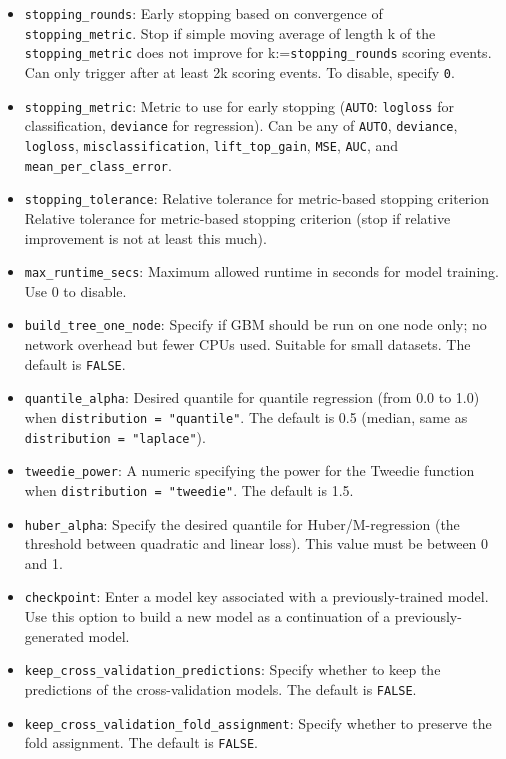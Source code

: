 \begin{itemize}
\item \texttt{stopping\_rounds}: Early stopping based on convergence of \\\texttt{stopping\_metric}. Stop if simple moving average of length k of the \texttt{stopping\_metric} does not improve for k:=\texttt{stopping\_rounds} scoring events. Can only trigger after at least 2k scoring events. To disable, specify \texttt{0}.
\item \texttt{stopping\_metric}: Metric to use for early stopping (\texttt{AUTO}: \texttt{logloss} for classification, \texttt{deviance} for regression). Can be any of \texttt{AUTO}, \texttt{deviance}, \texttt{logloss}, \texttt{misclassification}, \texttt{lift\_top\_gain}, \texttt{MSE}, \texttt{AUC}, and \texttt{mean\_per\_class\_error}.
\item \texttt{stopping\_tolerance}: Relative tolerance for metric-based stopping criterion Relative tolerance for metric-based stopping criterion (stop if relative improvement is not at least this much).
\item \texttt{max\_runtime\_secs}: Maximum allowed runtime in seconds for model training. Use 0 to disable.
\item {\texttt{build\_tree\_one\_node}}: Specify if GBM should be run on one node only; no network overhead but fewer CPUs used. Suitable for small datasets.  The default is {\texttt{FALSE}}.
\item {\texttt{quantile\_alpha}}: Desired quantile for quantile regression (from 0.0 to 1.0) when \texttt{distribution = "quantile"}.  The default is 0.5 (median, same as \texttt{distribution = "laplace"}).
\item {\texttt{tweedie\_power}}: A numeric specifying the power for the Tweedie function when \texttt{distribution = "tweedie"}.  The default is 1.5.
\item \texttt{huber\_alpha}: Specify the desired quantile for Huber/M-regression (the threshold between quadratic and linear loss). This value must be between 0 and 1.
\item {\texttt{checkpoint}}: Enter a model key associated with a previously-trained model. Use this option to build a new model as a continuation of a previously-generated model.
\item {\texttt{keep\_cross\_validation\_predictions}}: Specify whether to keep the predictions of the cross-validation models.   The default is {\texttt{FALSE}}.
\item {\texttt{keep\_cross\_validation\_fold\_assignment}}: Specify whether to preserve the fold assignment.   The default is {\texttt{FALSE}}.

\end{itemize}
